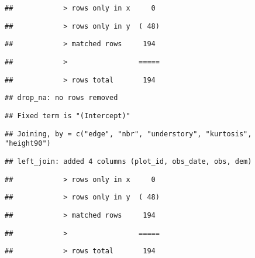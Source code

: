 \documentclass[
]{article}
\begin{document}
\begin{verbatim}
##            > rows only in x     0
\end{verbatim}

\begin{verbatim}
##            > rows only in y  ( 48)
\end{verbatim}

\begin{verbatim}
##            > matched rows     194
\end{verbatim}

\begin{verbatim}
##            >                 =====
\end{verbatim}

\begin{verbatim}
##            > rows total       194
\end{verbatim}

\begin{verbatim}
## drop_na: no rows removed
\end{verbatim}

\begin{verbatim}
## Fixed term is "(Intercept)"
\end{verbatim}

\begin{verbatim}
## Joining, by = c("edge", "nbr", "understory", "kurtosis", "height90")
\end{verbatim}

\begin{verbatim}
## left_join: added 4 columns (plot_id, obs_date, obs, dem)
\end{verbatim}

\begin{verbatim}
##            > rows only in x     0
\end{verbatim}

\begin{verbatim}
##            > rows only in y  ( 48)
\end{verbatim}

\begin{verbatim}
##            > matched rows     194
\end{verbatim}

\begin{verbatim}
##            >                 =====
\end{verbatim}

\begin{verbatim}
##            > rows total       194
\end{verbatim}
\end{document}
